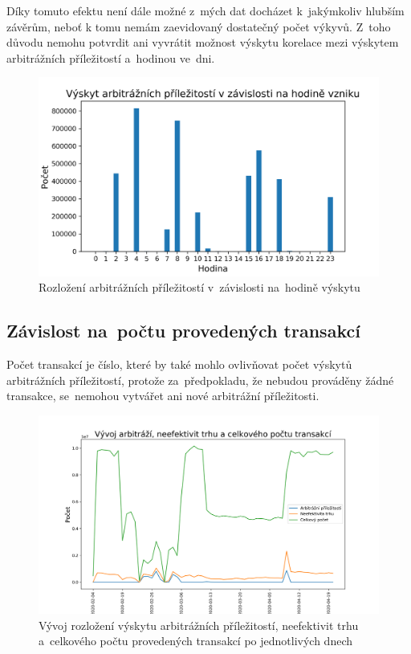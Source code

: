 \documentclass[thesis=B,czech]{FITthesis}[2019/03/21]
\begin{document}
Díky tomuto efektu není dále možné z~mých dat docházet k~jakýmkoliv hlubším závěrům, neboť k tomu nemám zaevidovaný dostatečný počet výkyvů. Z~toho důvodu nemohu potvrdit ani vyvrátit možnost výskytu korelace mezi výskytem arbitrážních příležitostí a~hodinou ve~dni.

\begin{figure}\centering
	\includegraphics[width=1\textwidth]{images/hours_distribution.png}
	\caption{Rozložení arbitrážních příležitostí v~závislosti na~hodině výskytu }\label{hours_distribution}
\end{figure}
\subsection{Závislost na~počtu provedených transakcí}
Počet transakcí je číslo, které by také mohlo ovlivňovat počet výskytů arbitrážních příležitostí, protože za~předpokladu, že nebudou prováděny žádné transakce, se~nemohou vytvářet ani nové arbitrážní příležitosti.

\begin{figure}\centering
	\includegraphics[width=1\textwidth]{images/occurence_correlation.png}
	\caption{Vývoj rozložení výskytu arbitrážních příležitostí, neefektivit trhu a~celkového počtu provedených transakcí po jednotlivých dnech}\label{occurence_correlation}
\end{figure}
\end{document}
